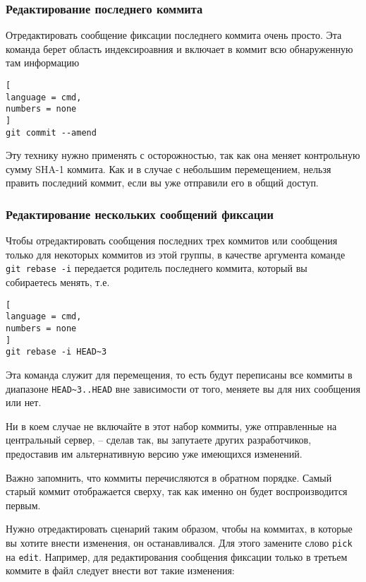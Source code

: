 \documentclass[%
	11pt,
	a4paper,
	utf8,
		]{article}
\begin{document}
\subsubsection{Редактирование последнего коммита}

Отредактировать сообщение фиксации последнего коммита очень просто. Эта команда берет область индексироавния и включает в коммит всю обнаруженную там информацию

\begin{lstlisting}[
language = cmd,
numbers = none
]
git commit --amend
\end{lstlisting}

Эту технику нужно применять с осторожностью, так как она меняет контрольную сумму SHA-1 коммита. Как и в случае с небольшим перемещением, нельзя править последний коммит, если вы уже отправили его в общий доступ.

\subsubsection{Редактирование нескольких сообщений фиксации}

Чтобы отредактировать сообщения последних трех коммитов или сообщения только для некоторых коммитов из этой группы, в качестве аргумента команде \texttt{git rebase -i} передается родитель последнего коммита, который вы собираетесь менять, т.е.

\begin{lstlisting}[
language = cmd,
numbers = none
]
git rebase -i HEAD~3
\end{lstlisting}

Эта команда служит для перемещения, то есть будут переписаны все коммиты в диапазоне \lstinline{HEAD~3..HEAD} вне зависимости от того, меняете вы для них сообщения или нет.

Ни в коем случае не включайте в этот набор коммиты, уже отправленные на центральный сервер, -- сделав так, вы запутаете других разработчиков, предоставив им альтернативную версию уже имеющихся изменений.

Важно запомнить, что коммиты перечисляются в обратном порядке. Самый старый коммит отображается сверху, так как именно он будет воспроизводится первым.

Нужно отредактировать сценарий таким образом, чтобы на коммитах, в которые вы хотите внести изменения, он останавливался. Для этого замените слово \texttt{pick} на \texttt{edit}. Например, для редактирования сообщения фиксации только в третьем коммите в файл следует внести вот такие изменения:
\end{document}
